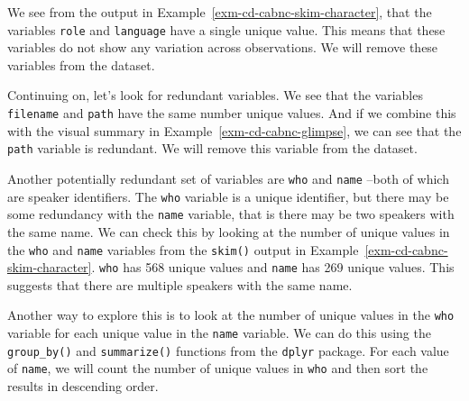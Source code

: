 \documentclass[
  letterpaper,
  DIV=11,
  numbers=noendperiod]{scrreprt}
\theoremstyle{definition}
\theoremstyle{remark}
\begin{document}
We see from the output in Example~\ref{exm-cd-cabnc-skim-character},
that the variables \texttt{role} and \texttt{language} have a single
unique value. This means that these variables do not show any variation
across observations. We will remove these variables from the dataset.

Continuing on, let's look for redundant variables. We see that the
variables \texttt{filename} and \texttt{path} have the same number
unique values. And if we combine this with the visual summary in
Example~\ref{exm-cd-cabnc-glimpse}, we can see that the \texttt{path}
variable is redundant. We will remove this variable from the dataset.

Another potentially redundant set of variables are \texttt{who} and
\texttt{name} --both of which are speaker identifiers. The \texttt{who}
variable is a unique identifier, but there may be some redundancy with
the \texttt{name} variable, that is there may be two speakers with the
same name. We can check this by looking at the number of unique values
in the \texttt{who} and \texttt{name} variables from the \texttt{skim()}
output in Example~\ref{exm-cd-cabnc-skim-character}. \texttt{who} has
568 unique values and \texttt{name} has 269 unique values. This suggests
that there are multiple speakers with the same name.

Another way to explore this is to look at the number of unique values in
the \texttt{who} variable for each unique value in the \texttt{name}
variable. We can do this using the \texttt{group\_by()} and
\texttt{summarize()} functions from the \texttt{dplyr} package. For each
value of \texttt{name}, we will count the number of unique values in
\texttt{who} and then sort the results in descending order.
\end{document}
